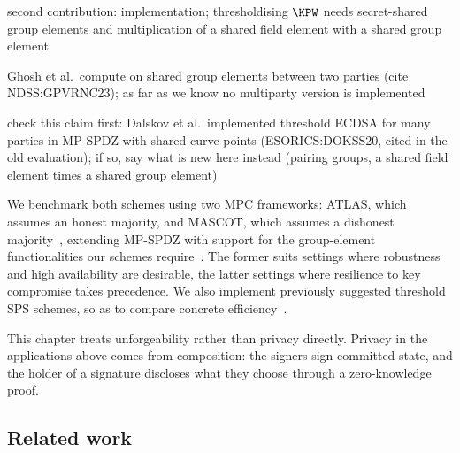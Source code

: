 \begin{outline}
  \item second contribution: implementation; thresholdising $\KPW$ needs
secret-shared group elements and multiplication of a shared field element with a
shared group element
  \item Ghosh et al.\ compute on shared group elements between two parties (cite
NDSS:GPVRNC23); as far as we know no multiparty version is implemented
  \item check this claim first: Dalskov et al.\ implemented threshold ECDSA for
many parties in MP-SPDZ with shared curve points (ESORICS:DOKSS20, cited in the
old evaluation); if so, say what is new here instead (pairing groups, a shared
field element times a shared group element)
\end{outline}

We benchmark both schemes using two MPC frameworks: ATLAS, which assumes an
honest majority, and MASCOT, which assumes a dishonest
majority~\cite{C:GLOPS21,CCS:KelOrsSch16}, extending MP-SPDZ with support for
the group-element functionalities our schemes require~\cite{CCS:Keller20}. The
former suits settings where robustness and high availability are desirable, the
latter settings where resilience to key compromise takes precedence. We also
implement previously suggested threshold SPS schemes, so as to compare concrete
efficiency~\cite{AC:CKPSS23,PKC:MMSST24}.

This chapter treats unforgeability rather than privacy directly. Privacy in the
applications above comes from composition: the signers sign committed state, and
the holder of a signature discloses what they choose through a zero-knowledge
proof.

\subsection*{Related work}


